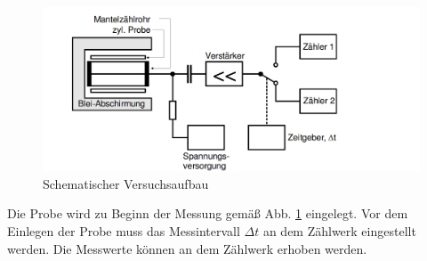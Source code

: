 \begin{figure}
  \centering
  \includegraphics[width=\textwidth]{V702_Aufbau.png}
  \caption{Schematischer Versuchsaufbau\cite{anleitung01}}
  \label{fig:Aufbau}
\end{figure}

Die Probe wird zu Beginn der Messung gemäß Abb. \ref{fig:Aufbau} eingelegt.
Vor dem Einlegen der Probe muss das Messintervall $\Delta t$ an dem Zählwerk
eingestellt werden. Die Messwerte können an dem Zählwerk erhoben werden.

\newpage

\printbibliography


